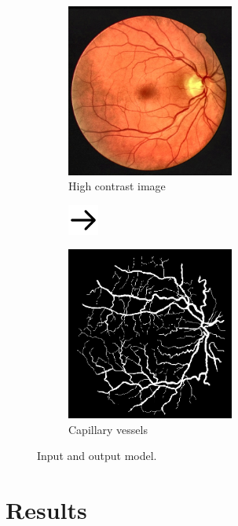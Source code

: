 \begin{frame}{\insertsectionhead}
  \begin{figure}[H]
    \begin{subfigure}{5.5cm}
      \includegraphics[width=5.5cm]{Graphics/high_contrast.jpg}
      \caption{High contrast image}
    \end{subfigure}
    \begin{subfigure}{1cm}
      \includegraphics[width=1cm]{Graphics/rightarrow.png}
    \end{subfigure}
    \begin{subfigure}{5.5cm}
      \includegraphics[width=5.5cm]{Graphics/mask.png}
      \caption{Capillary vessels}
    \end{subfigure}
    \caption{Input and output model.}
  \end{figure}
\end{frame}

\section{Results}

